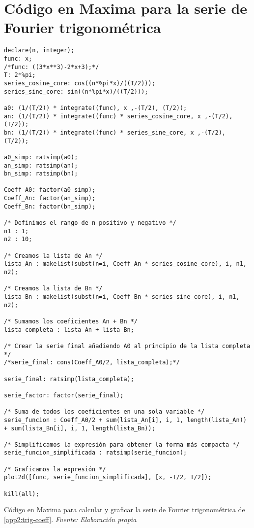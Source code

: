 \section{Código en Maxima para la serie de Fourier trigonométrica}\label{app3:trig-code-maxima}
\begin{longlisting}
	\begin{verbatim}
declare(n, integer);
func: x;
/*func: ((3*x**3)-2*x+3);*/
T: 2*%pi;
series_cosine_core: cos((n*%pi*x)/((T/2)));
series_sine_core: sin((n*%pi*x)/((T/2)));

a0: (1/(T/2)) * integrate((func), x ,-(T/2), (T/2));
an: (1/(T/2)) * integrate((func) * series_cosine_core, x ,-(T/2), (T/2));
bn: (1/(T/2)) * integrate((func) * series_sine_core, x ,-(T/2), (T/2));

a0_simp: ratsimp(a0);
an_simp: ratsimp(an);
bn_simp: ratsimp(bn);

Coeff_A0: factor(a0_simp);
Coeff_An: factor(an_simp);
Coeff_Bn: factor(bn_simp);

/* Definimos el rango de n positivo y negativo */
n1 : 1;
n2 : 10;

/* Creamos la lista de An */
lista_An : makelist(subst(n=i, Coeff_An * series_cosine_core), i, n1, n2);

/* Creamos la lista de Bn */
lista_Bn : makelist(subst(n=i, Coeff_Bn * series_sine_core), i, n1, n2);

/* Sumamos los coeficientes An + Bn */
lista_completa : lista_An + lista_Bn;

/* Crear la serie final añadiendo A0 al principio de la lista completa */
/*serie_final: cons(Coeff_A0/2, lista_completa);*/

serie_final: ratsimp(lista_completa);

serie_factor: factor(serie_final);

/* Suma de todos los coeficientes en una sola variable */
serie_funcion : Coeff_A0/2 + sum(lista_An[i], i, 1, length(lista_An)) + sum(lista_Bn[i], i, 1, length(lista_Bn));

/* Simplificamos la expresión para obtener la forma más compacta */
serie_funcion_simplificada : ratsimp(serie_funcion);

/* Graficamos la expresión */
plot2d([func, serie_funcion_simplificada], [x, -T/2, T/2]);

kill(all);	
	\end{verbatim}
	\caption[Código en Maxima para calcular y graficar la serie de Fourier trigonométrica de \ref{app2:trig-coeff}.] {Código en Maxima para calcular y graficar la serie de Fourier trigonométrica de \ref{app2:trig-coeff}. \textit{Fuente: Elaboración propia}} 
\end{longlisting}


